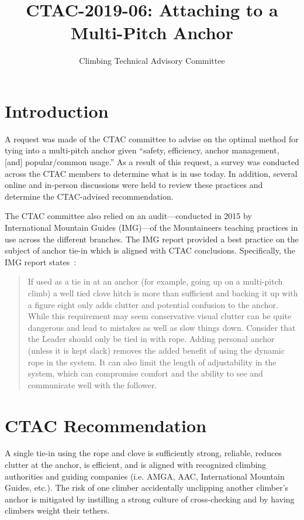 \documentclass[nonacm,acmtog]{acmart}
\title{CTAC-2019-06: Attaching to a Multi-Pitch Anchor}
\subtitle{Climbing Technical Advisory Committee}
\begin{document}
\maketitle

\section{Introduction}
  A request was made of the CTAC committee to advise on the optimal method for
  tying into a multi-pitch anchor given “safety, efficiency, anchor management,
  [and] popular/common usage.” As a result of this request, a survey was
  conducted across the CTAC members to determine what is in use today. In
  addition, several online and in-person discussions were held to review these
  practices and determine the CTAC-advised recommendation.

  The CTAC committee also relied on an audit---conducted in 2015 by
  International Mountain Guides (IMG)---of the Mountaineers teaching practices
  in use across the different branches. The IMG report provided a best practice
  on the subject of anchor tie-in which is aligned with CTAC conclusions.
  Specifically, the IMG report states~\cite{ref:imga-course-review}:

\begin{quote}
  If used as a tie in at an anchor (for example, going up on a multi-pitch
  climb) a well tied clove hitch is more than sufficient and backing it up with
  a figure eight only adds clutter and potential confusion to the anchor. While
  this requirement may seem conservative visual clutter can be quite dangerous
  and lead to mistakes as well as slow things down. Consider that the Leader
  should only be tied in with rope. Adding personal anchor (unless it is kept
  slack) removes the added benefit of using the dynamic rope in the system. It
  can also limit the length of adjustability in the system, which can
  compromise comfort and the ability to see and communicate well with the
  follower.
\end{quote}

\section{CTAC Recommendation}
A single tie-in using the rope and clove  is sufficiently strong, reliable,
reduces clutter at the anchor, is efficient, and is aligned with recognized
climbing authorities and guiding companies (i.e. AMGA, AAC, International
Mountain Guides, etc.).  The risk of one climber accidentally unclipping
another climber's anchor is mitigated by instilling a strong culture of
cross-checking and by having climbers weight their tethers.
\end{document}
